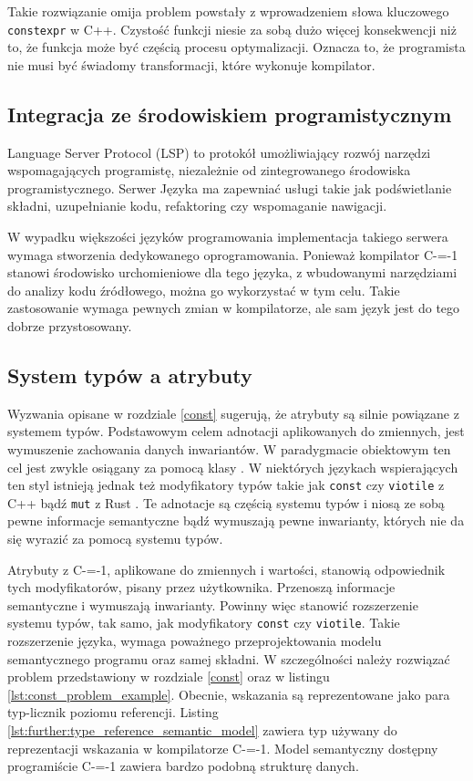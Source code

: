 Takie rozwiązanie omija problem powstały z wprowadzeniem słowa kluczowego \lstinline{constexpr} w C++\cite{Klimiankou:contexpr_great_good_wrong_idea}.
Czystość funkcji niesie za sobą dużo więcej konsekwencji niż to, że funkcja może być częścią procesu optymalizacji.
Oznacza to, że programista nie musi być świadomy transformacji, które wykonuje kompilator.

\subsection{Integracja ze środowiskiem programistycznym}
\label{IDE_integration}

Language Server Protocol (LSP) \cite{bunder2019decoupling_lsp} to protokół umożliwiający rozwój narzędzi wspomagających programistę, niezależnie od zintegrowanego środowiska programistycznego.
Serwer Języka ma zapewniać usługi takie jak podświetlanie składni, uzupełnianie kodu, refaktoring czy wspomaganie nawigacji.

W wypadku większości języków programowania implementacja takiego serwera wymaga stworzenia dedykowanego oprogramowania.
Ponieważ kompilator C-=-1 stanowi środowisko urchomieniowe dla tego języka, z wbudowanymi narzędziami do analizy kodu źródłowego, można go wykorzystać w tym celu.
Takie zastosowanie wymaga pewnych zmian w kompilatorze, ale sam język jest do tego dobrze przystosowany.

\subsection{System typów a atrybuty}
\label{further:adnotated_type_system}

Wyzwania opisane w rozdziale \ref{const} sugerują, że atrybuty są silnie powiązane z systemem typów.
Podstawowym celem adnotacji aplikowanych do zmiennych, jest wymuszenie zachowania danych inwariantów.
W paradygmacie obiektowym ten cel jest zwykle osiągany za pomocą klasy \cite{oop_paradignm}.
W niektórych językach wspierających ten styl istnieją jednak też modyfikatory typów takie jak \lstinline{const} czy \lstinline{viotile} z C++ bądź \lstinline{mut} z Rust \cite{klabnik2019rust}.
Te adnotacje są częścią systemu typów i niosą ze sobą pewne informacje semantyczne bądź wymuszają pewne inwarianty, których nie da się wyrazić za pomocą systemu typów.

Atrybuty z C-=-1, aplikowane do zmiennych i wartości, stanowią odpowiednik tych modyfikatorów, pisany przez użytkownika.
Przenoszą informacje semantyczne i wymuszają inwarianty.
Powinny więc stanowić rozszerzenie systemu typów, tak samo, jak modyfikatory \lstinline{const} czy \lstinline{viotile}.
Takie rozszerzenie języka, wymaga poważnego przeprojektowania modelu semantycznego programu oraz samej składni.
W szczególności należy rozwiązać problem przedstawiony w rozdziale \ref{const} oraz w listingu \ref{lst:const_problem_example}.
Obecnie, wskazania są reprezentowane jako para typ-licznik poziomu referencji.
Listing \ref{lst:further:type_reference_semantic_model} zawiera typ używany do reprezentacji wskazania w kompilatorze C-=-1.
Model semantyczny dostępny programiście C-=-1 zawiera bardzo podobną strukturę danych.

